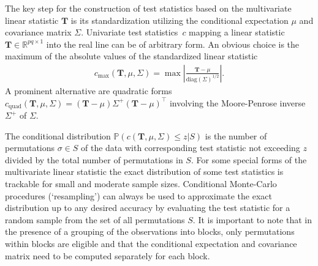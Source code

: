 \documentclass{article}
\newcommand{\Rpackage}[1]{\textit{#1}}
\newcommand{\R}{\mathbb{R} }
\newcommand{\Prob}{\mathbb{P} }
\newcommand{\T}{\mathbf{T}}
\begin{document}
The key step for the construction of test statistics based on the multivariate
linear statistic $\T$ is its standardization utilizing the 
conditional expectation $\mu$ and covariance matrix $\Sigma$. 
Univariate test statistics~$c$ mapping a linear
statistic $\T \in \R^{pq \times 1}$ 
into the real line can be of arbitrary form.  An obvious choice is
the maximum of the absolute values of the standardized linear statistic
\begin{eqnarray*}
c_\text{max}(\T, \mu, \Sigma)  = \max \left| \frac{\T -
\mu}{\text{diag}(\Sigma)^{1/2}} \right|.
\end{eqnarray*}
A prominent alternative are quadratic forms 
$c_\text{quad}(\T, \mu, \Sigma)  =
(\T - \mu) \Sigma^+ (\T - \mu)^\top$ involving 
the Moore-Penrose inverse $\Sigma^+$ of $\Sigma$.


The conditional distribution $\Prob(c(\T, \mu, \Sigma) \le z | S)$
is the number of permutations $\sigma \in S$ of the data 
with corresponding test statistic not exceeding $z$ divided by the total number
of permutations in $S$. For some special forms of the
multivariate linear statistic the exact distribution of some 
test statistics is trackable for small and moderate sample sizes.
Conditional Monte-Carlo procedures (`resampling') can always be used to 
approximate the exact distribution up to any desired accuracy by evaluating
the test statistic for a random sample from the set of all permutations $S$.
It is important to note that in the presence of a grouping of the observations
into blocks, only permutations within blocks are eligible and that the
conditional expectation and covariance matrix need to be computed
separately for each block.
\end{document}
